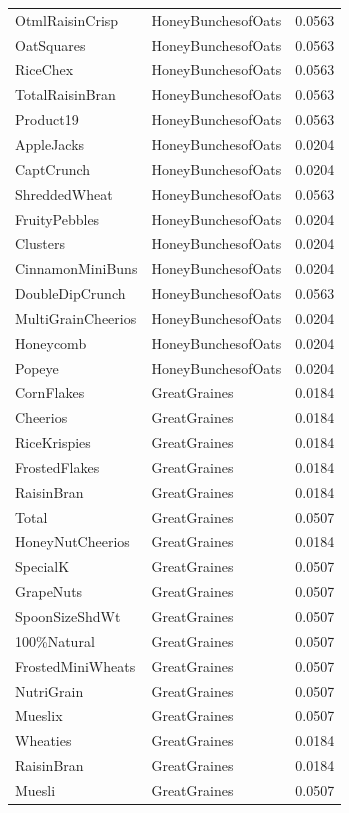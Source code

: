 \begin{table}[!htbp]
\begin{tabular}{lll}
\\
OtmlRaisinCrisp & HoneyBunchesofOats & 0.0563
\\
OatSquares & HoneyBunchesofOats & 0.0563
\\
RiceChex & HoneyBunchesofOats & 0.0563
\\
TotalRaisinBran & HoneyBunchesofOats & 0.0563
\\
Product19 & HoneyBunchesofOats & 0.0563
\\
AppleJacks & HoneyBunchesofOats & 0.0204
\\
CaptCrunch & HoneyBunchesofOats & 0.0204
\\
ShreddedWheat & HoneyBunchesofOats & 0.0563
\\
FruityPebbles & HoneyBunchesofOats & 0.0204
\\
Clusters & HoneyBunchesofOats & 0.0204
\\
CinnamonMiniBuns & HoneyBunchesofOats & 0.0204
\\
DoubleDipCrunch & HoneyBunchesofOats & 0.0563
\\
MultiGrainCheerios & HoneyBunchesofOats & 0.0204
\\
Honeycomb & HoneyBunchesofOats & 0.0204
\\
Popeye & HoneyBunchesofOats & 0.0204
\\
CornFlakes & GreatGraines & 0.0184
\\
Cheerios & GreatGraines & 0.0184
\\
RiceKrispies & GreatGraines & 0.0184
\\
FrostedFlakes & GreatGraines & 0.0184
\\
RaisinBran & GreatGraines & 0.0184
\\
Total & GreatGraines & 0.0507
\\
HoneyNutCheerios & GreatGraines & 0.0184
\\
SpecialK & GreatGraines & 0.0507
\\
GrapeNuts & GreatGraines & 0.0507
\\
SpoonSizeShdWt & GreatGraines & 0.0507
\\
100\%Natural & GreatGraines & 0.0507
\\
FrostedMiniWheats & GreatGraines & 0.0507
\\
NutriGrain & GreatGraines & 0.0507
\\
Mueslix & GreatGraines & 0.0507
\\
Wheaties & GreatGraines & 0.0184
\\
RaisinBran & GreatGraines & 0.0184
\\
Muesli & GreatGraines & 0.0507

\end{tabular}
\end{table}
